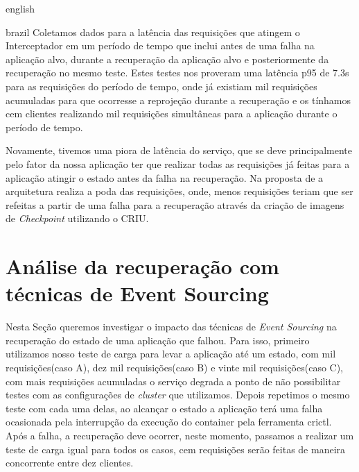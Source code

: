 \begin{otherlanguage*}{english}
\begin{otherlanguage*}{brazil}
Coletamos dados para a latência das requisições que atingem o Interceptador em um período de
tempo que inclui antes de uma falha na aplicação alvo, durante a recuperação da aplicação
alvo e posteriormente da recuperação no mesmo teste. Estes testes nos proveram uma latência
p95 de 7.3s para as requisições do período de tempo, onde já existiam mil requisições
acumuladas para que ocorresse a reprojeção durante a recuperação e os tínhamos cem clientes
realizando mil requisições simultâneas para a aplicação durante o período de tempo.

Novamente, tivemos uma piora de latência do serviço, que se deve principalmente pelo fator
da nossa aplicação ter que realizar todas as requisições já feitas para a aplicação atingir
o estado antes da falha na recuperação. Na proposta de \cite{muller2022architecture} a
arquitetura realiza a poda das requisições, onde, menos requisições teriam que ser refeitas
a partir de uma falha para a recuperação através da criação de imagens de \textit{Checkpoint}
utilizando o CRIU.

\section{Análise da recuperação com técnicas de Event Sourcing}

Nesta Seção queremos investigar o impacto das técnicas de \textit{Event Sourcing} na
recuperação do estado de uma aplicação que falhou. Para isso, primeiro utilizamos nosso teste
de carga para levar a aplicação até um estado, com mil requisições(caso A), dez mil
requisições(caso B) e vinte mil requisições(caso C), com mais requisições acumuladas o serviço
degrada a ponto de não possibilitar testes com as configurações de \textit{cluster} que utilizamos.
Depois repetimos o mesmo teste com cada uma delas, ao alcançar o estado a aplicação terá uma falha
ocasionada pela interrupção da execução do container pela ferramenta crictl. Após a falha,
a recuperação deve ocorrer, neste momento, passamos a realizar um teste de carga igual para
todos os casos, cem requisições serão feitas de maneira concorrente entre dez clientes.


\end{otherlanguage*}
\end{otherlanguage*}
